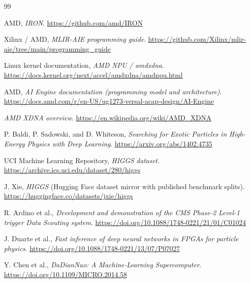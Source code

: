 \documentclass[a4paper,11pt]{article}
\begin{document}
\begin{thebibliography}{99}

AMD, \emph{IRON}.\newline
\url{https://github.com/amd/IRON}

Xilinx / AMD, \emph{MLIR-AIE programming guide}.\newline
\url{https://github.com/Xilinx/mlir-aie/tree/main/programming_guide}

Linux kernel documentation, \emph{AMD NPU / amdxdna}.\newline
\url{https://docs.kernel.org/next/accel/amdxdna/amdnpu.html}

AMD, \emph{AI Engine documentation (programming model and architecture)}.\newline
\url{https://docs.amd.com/r/en-US/ug1273-versal-acap-design/AI-Engine}

\emph{AMD XDNA overview}.\newline
\url{https://en.wikipedia.org/wiki/AMD_XDNA}

P. Baldi, P. Sadowski, and D. Whiteson, \emph{Searching for Exotic Particles in
High-Energy Physics with Deep Learning}.\newline
\url{https://arxiv.org/abs/1402.4735}

UCI Machine Learning Repository, \emph{HIGGS dataset}.\newline
\url{https://archive.ics.uci.edu/dataset/280/higgs}

J. Xie, \emph{HIGGS} (Hugging Face dataset mirror with published benchmark
splits).\newline
\url{https://huggingface.co/datasets/jxie/higgs}

R. Ardino et al., \emph{Development and demonstration of the CMS Phase-2
Level-1 trigger Data Scouting system}.\newline
\url{https://doi.org/10.1088/1748-0221/21/01/C01024}

J. Duarte et al., \emph{Fast inference of deep neural networks in FPGAs for
particle physics}.\newline
\url{https://doi.org/10.1088/1748-0221/13/07/P07027}

Y. Chen et al., \emph{DaDianNao: A Machine-Learning Supercomputer}.\newline
\url{https://doi.org/10.1109/MICRO.2014.58}


\end{thebibliography}
\end{document}
